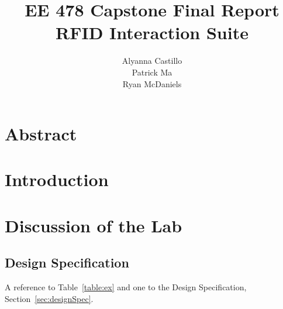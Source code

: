 \documentclass[12pt]{article} %
\title{\TitleFont EE 478 Capstone Final Report \\ RFID Interaction Suite \vfill }
\author{\AuthorFont Alyanna Castillo \\ Patrick Ma \\ Ryan McDaniels}
\date{}
\begin{document}
\maketitle
\thispagestyle{empty}
\pagebreak \tableofcontents
\listoftables
\listoffigures
\thispagestyle{empty}
\pagebreak
\setcounter{page}{1}

\section{Abstract}
% 

\section{Introduction}

\section{Discussion of the Lab}


\subsection{Design Specification}


A reference to Table~\ref{table:ex} and one to the Design Specification, Section~\ref{sec:designSpec}.
\end{document}
